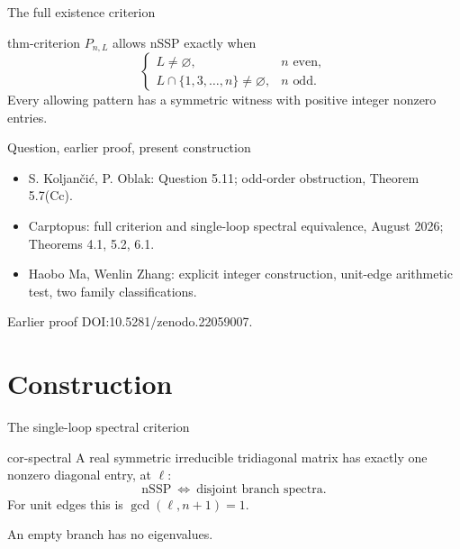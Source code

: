 \documentclass{beamer}
\begin{document}
\begin{frame}{The full existence criterion}
\begin{bookresult}{thm-criterion}
$P_{n,L}$ allows nSSP exactly when
\[
\begin{cases}L\ne\varnothing,&n\text{ even},\\
L\cap\{1,3,\ldots,n\}\ne\varnothing,&n\text{ odd}.
\end{cases}
\]
Every allowing pattern has a symmetric witness with positive integer nonzero entries.
\end{bookresult}
\end{frame}

\begin{frame}{Question, earlier proof, present construction}
\begin{itemize}
\item S. Koljančić, P. Oblak: Question 5.11; odd-order obstruction, Theorem 5.7(Cc).
\item Carptopus: full criterion and single-loop spectral equivalence, August 2026; Theorems 4.1, 5.2, 6.1.
\item Haobo Ma, Wenlin Zhang: explicit integer construction, unit-edge arithmetic test, two family classifications.
\end{itemize}
\small Earlier proof DOI:10.5281/zenodo.22059007.
\end{frame}

\section{Construction}
\begin{frame}{The single-loop spectral criterion}
\begin{bookresult}{cor-spectral}
A real symmetric irreducible tridiagonal matrix has exactly one nonzero diagonal entry, at $\ell$:
\[\text{nSSP}\ \Longleftrightarrow\ \text{disjoint branch spectra}.\]
For unit edges this is $\gcd(\ell,n+1)=1$.
\end{bookresult}
An empty branch has no eigenvalues.
\end{frame}
\end{document}
